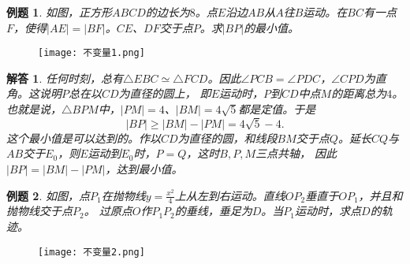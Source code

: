 \documentclass[12pt,UTF8]{ctexbook}
\newtheorem{et}{例题}[section]
\newtheorem*{so}{解答}
\begin{document}
\begin{et}
    如图，正方形$ABCD$的边长为$8$。点$E$沿边$AB$从$A$往$B$运动。在$BC$有一点$F$，使得$|AE| = |BF|$。$CE$、$DF$交于点$P$。求$|BP|$的最小值。
\end{et}

\begin{figure}[H] %
    \vspace{4pt}
    \centering
    \texttt{[image: 不变量1.png]}
\end{figure}

\begin{so}
    任何时刻，总有$\triangle EBC \simeq \triangle FCD$。因此$\angle PCB = \angle PDC$，$\angle CPD$为直角。这说明$P$总在以$CD$为直径的圆上，
    即$E$运动时，$P$到$CD$中点$M$的距离总为$4$。也就是说，$\triangle BPM$中，$|PM| = 4$、$|BM| = 4\sqrt{5}$都是定值。于是
    $$ |BP| \geqslant |BM| - |PM| = 4\sqrt{5} - 4.$$
    这个最小值是可以达到的。作以$CD$为直径的圆，和线段$BM$交于点$Q$。延长$CQ$与$AB$交于$E_0$，则$E$运动到$E_0$时，$P=Q$，这时$B,P,M$三点共轴，
    因此$|BP| = |BM| - |PM|$，达到最小值。
\end{so}

\begin{et}
    如图，点$P_1$在抛物线$y = \frac{x^2}{4}$上从左到右运动。直线$OP_2$垂直于$OP_1$，并且和抛物线交于点$P_2$。
    过原点$O$作$P_1P_2$的垂线，垂足为$D$。当$P_1$运动时，求点$D$的轨迹。
\end{et}

\begin{figure}[H] %
    \vspace{4pt}
    \centering
    \texttt{[image: 不变量2.png]}
\end{figure}
\end{document}
